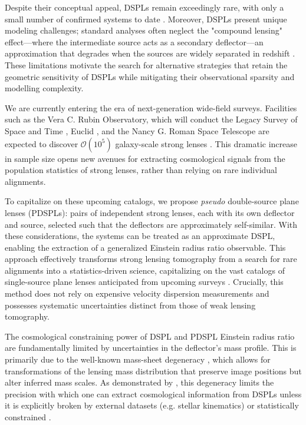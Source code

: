 \documentclass[a4paper,11pt]{article}
\begin{document}
Despite their conceptual appeal, DSPLs remain exceedingly rare, with only a small number of confirmed systems to date \citep[e.g.,][]{Gavazzi:2008, Tanaka:2016, Wong:2017, Tanaka:2020, Dux:2025, Li:2025}. Moreover, DSPLs present unique modeling challenges; standard analyses often neglect the "compound lensing" effect—where the intermediate source acts as a secondary deflector—an approximation that degrades when the sources are widely separated in redshift \citep{Johnson:2025}. These limitations motivate the search for alternative strategies that retain the geometric sensitivity of DSPLs while mitigating their observational sparsity and modelling complexity.

We are currently entering the era of next-generation wide-field surveys. Facilities such as the Vera C. Rubin Observatory, which will conduct the Legacy Survey of Space and Time \citep[LSST;][]{Rubin:Ivezic:2019}, Euclid \cite{Euclid:Laureijs:2011}, and the Nancy G. Roman Space Telescope \citep[formerly WFIRST; ][]{Roman:Spergel:2015} are expected to discover $\mathcal{O}(10^5)$ galaxy-scale strong lenses \citep{Collett:2015, Shajib:2024, Ferrami:2024, Wedig:2025}. This dramatic increase in sample size opens new avenues for extracting cosmological signals from the population statistics of strong lenses, rather than relying on rare individual alignments.

To capitalize on these upcoming catalogs, we propose \emph{pseudo} double-source plane lenses (PDSPLs): pairs of independent strong lenses, each with its own deflector and source, selected such that the deflectors are approximately self-similar. With these considerations, the systems can be treated as an approximate DSPL, enabling the extraction of a generalized Einstein radius ratio observable. This approach effectively transforms strong lensing tomography from a search for rare alignments into a statistics-driven science, capitalizing on the vast catalogs of single-source plane lenses anticipated from upcoming surveys \citep{Collett:2015, Shajib:2024}. Crucially, this method does not rely on expensive velocity dispersion measurements and possesses systematic uncertainties distinct from those of weak lensing tomography.

The cosmological constraining power of DSPL and PDSPL Einstein radius ratio are fundamentally limited by uncertainties in the deflector’s mass profile. This is primarily due to the well-known mass-sheet degeneracy \citep[MSD;][]{Falco:1985}, which allows for transformations of the lensing mass distribution that preserve image positions but alter inferred mass scales. As demonstrated by \cite{Schneider:2014}, this degeneracy limits the precision with which one can extract cosmological information from DSPLs unless it is explicitly broken by external datasets (e.g. stellar kinematics) or statistically constrained \citep{Birrer:2020, Khadka:2024}.
\end{document}
